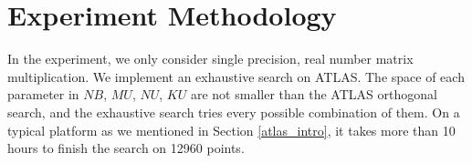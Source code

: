 \section{Experiment Methodology}
\label{sec:experiment}

In the experiment, we only consider single precision, real number matrix multiplication. We implement 
an exhaustive search on ATLAS. The space of each parameter in $NB$, $MU$, $NU$, $KU$ are not smaller 
than the ATLAS orthogonal search, and the exhaustive search tries every possible combination of them. 
On a typical platform as we mentioned in Section \ref{atlas_intro}, it takes more than 10 hours to finish 
the search on 12960 points. 


